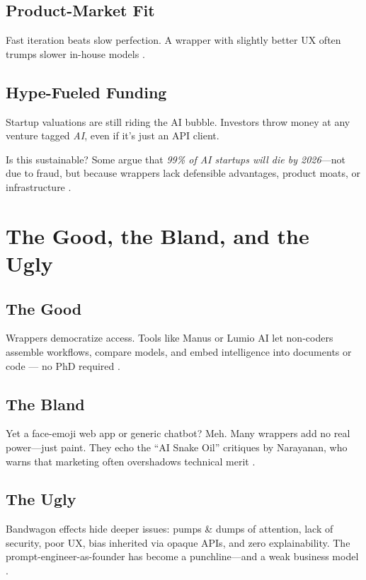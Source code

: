 \subsection{Product-Market Fit}
Fast iteration beats slow perfection.
A wrapper with slightly better UX often trumps slower in-house models \cite{skooloflife2025dead, krunal2025hype}.

\subsection{Hype-Fueled Funding}
Startup valuations are still riding the AI bubble.
Investors throw money at any venture tagged \emph{AI}, even if it's just an API client.

Is this sustainable? Some argue that \emph{99\% of AI startups will die by 2026}---not due to fraud, but because wrappers lack defensible advantages, product moats, or infrastructure \cite{skooloflife2025dead}.

\section{The Good, the Bland, and the Ugly}

\subsection{The Good}
Wrappers democratize access.
Tools like Manus or Lumio AI let non-coders assemble workflows, compare models, and embed intelligence into documents or code --- no PhD required \cite{lumio2025}.

\subsection{The Bland}
Yet a face-emoji web app or generic chatbot? Meh.
Many wrappers add no real power---just paint. They echo the ``AI Snake Oil'' critiques by Narayanan, who warns that marketing often overshadows technical merit \cite{narayanan2023snakeoil}.

\subsection{The Ugly}
Bandwagon effects hide deeper issues:
pumps \& dumps of attention, lack of security, poor UX, bias inherited via opaque APIs, and zero explainability.
The prompt-engineer-as-founder has become a punchline---and a weak business model \cite{wiggins2024hype}.

